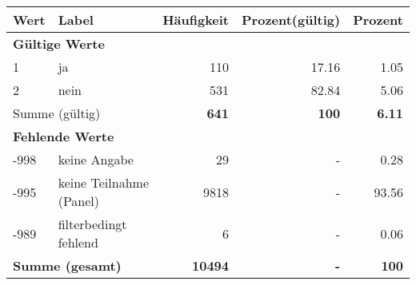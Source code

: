      \begin{longtable}{lXrrr}
     \toprule
     \textbf{Wert} & \textbf{Label} & \textbf{Häufigkeit} & \textbf{Prozent(gültig)} & \textbf{Prozent} \\
     \endhead
     \midrule
     \multicolumn{5}{l}{\textbf{Gültige Werte}}\\

     1 &
     \multicolumn{1}{X}{ ja   } &


       \num{110} &
       \num[round-mode=places,round-precision=2]{17.16} &
         \num[round-mode=places,round-precision=2]{1.05} \\

     2 &
     \multicolumn{1}{X}{ nein   } &


       \num{531} &
       \num[round-mode=places,round-precision=2]{82.84} &
         \num[round-mode=places,round-precision=2]{5.06} \\
     \midrule
     \multicolumn{2}{l}{Summe (gültig)} &
       \textbf{\num{641}} &
     \textbf{\num{100}} &
       \textbf{\num[round-mode=places,round-precision=2]{6.11}} \\
     \multicolumn{5}{l}{\textbf{Fehlende Werte}}\\
       -998 &
       keine Angabe &
         \num{29} &
        - &
         \num[round-mode=places,round-precision=2]{0.28} \\
       -995 &
       keine Teilnahme (Panel) &
         \num{9818} &
        - &
         \num[round-mode=places,round-precision=2]{93.56} \\
       -989 &
       filterbedingt fehlend &
         \num{6} &
        - &
         \num[round-mode=places,round-precision=2]{0.06} \\
     \midrule
     \multicolumn{2}{l}{\textbf{Summe (gesamt)}} &
          \textbf{\num{10494}} &
        \textbf{-} &
        \textbf{\num{100}} \\
     \bottomrule
     \end{longtable}
     
